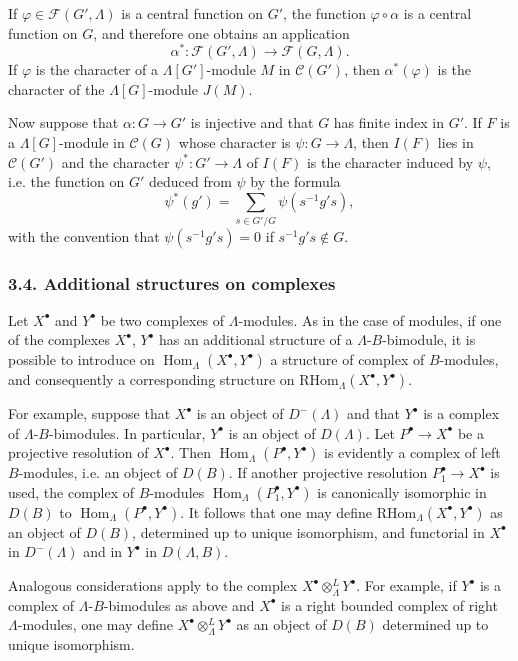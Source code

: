 \documentclass[11pt]{article}
\DeclareMathOperator{\Hom}{Hom}
\providecommand{\RHom}{\mathrm{RHom}}
\providecommand{\RHom}{\mathrm{RHom}}
\providecommand{\Hom}{\operatorname{Hom}}
\providecommand{\RHom}{\mathrm R\mathcal{H}om}
\providecommand{\RHom}{\mathrm{RHom}}
\begin{document}
If $\varphi\in\mathcal F(G',\Lambda)$ is a central function on $G'$, the function $\varphi\circ\alpha$ is a central function on $G$, and therefore one obtains an application
\[
\alpha^*: \mathcal F(G',\Lambda)\longrightarrow\mathcal F(G,\Lambda).
\]
If $\varphi$ is the character of a $\Lambda[G']$-module $M$ in $\mathcal C(G')$, then $\alpha^*(\varphi)$ is the character of the $\Lambda[G]$-module $J(M)$.

Now suppose that $\alpha:G\to G'$ is injective and that $G$ has finite index in $G'$. If $F$ is a $\Lambda[G]$-module in $\mathcal C(G)$ whose character is $\psi:G\to\Lambda$, then $I(F)$ lies in $\mathcal C(G')$ and the character $\psi^*:G'\to\Lambda$ of $I(F)$ is the character induced by $\psi$, i.e. the function on $G'$ deduced from $\psi$ by the formula
\[
\psi^*(g')=\sum_{s\in G'/G}\psi(s^{-1}g's),
\tag{3.3.1}
\]
with the convention that $\psi(s^{-1}g's)=0$ if $s^{-1}g's\notin G$.

\subsubsection*{3.4. Additional structures on complexes}

Let $X^\bullet$ and $Y^\bullet$ be two complexes of $\Lambda$-modules. As in the case of modules, if one of the complexes $X^\bullet$, $Y^\bullet$ has an additional structure of a $\Lambda$-$B$-bimodule, it is possible to introduce on $\Hom_\Lambda(X^\bullet,Y^\bullet)$ a structure of complex of $B$-modules, and consequently a corresponding structure on $\RHom_\Lambda(X^\bullet,Y^\bullet)$.

For example, suppose that $X^\bullet$ is an object of $D^-(\Lambda)$ and that $Y^\bullet$ is a complex of $\Lambda$-$B$-bimodules. In particular, $Y^\bullet$ is an object of $D(\Lambda)$. Let $P^\bullet\to X^\bullet$ be a projective resolution of $X^\bullet$. Then $\Hom_\Lambda(P^\bullet,Y^\bullet)$ is evidently a complex of left $B$-modules, i.e. an object of $D(B)$. If another projective resolution $P_1^\bullet\to X^\bullet$ is used, the complex of $B$-modules $\Hom_\Lambda(P_1^\bullet,Y^\bullet)$ is canonically isomorphic in $D(B)$ to $\Hom_\Lambda(P^\bullet,Y^\bullet)$. It follows that one may define $\RHom_\Lambda(X^\bullet,Y^\bullet)$ as an object of $D(B)$, determined up to unique isomorphism, and functorial in $X^\bullet$ in $D^-(\Lambda)$ and in $Y^\bullet$ in $D(\Lambda,B)$.

Analogous considerations apply to the complex $X^\bullet\otimes_\Lambda^L Y^\bullet$. For example, if $Y^\bullet$ is a complex of $\Lambda$-$B$-bimodules as above and $X^\bullet$ is a right bounded complex of right $\Lambda$-modules, one may define $X^\bullet\otimes_\Lambda^L Y^\bullet$ as an object of $D(B)$ determined up to unique isomorphism.
\end{document}
